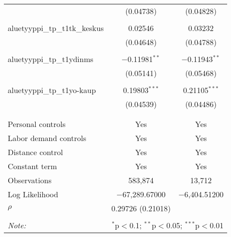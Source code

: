 \begin{table}[!htbp]
\begin{tabular}{@{\extracolsep{5pt}}lcc}
  & (0.04738) & (0.04828) \\ 
  & & \\ 
 aluetyyppi\_tp\_t1tk\_keskus & 0.02546 & 0.03232 \\ 
  & (0.04648) & (0.04788) \\ 
  & & \\ 
 aluetyyppi\_tp\_t1ydinms & $-$0.11981$^{**}$ & $-$0.11943$^{**}$ \\ 
  & (0.05141) & (0.05468) \\ 
  & & \\ 
 aluetyyppi\_tp\_t1yo-kaup & 0.19803$^{***}$ & 0.21105$^{***}$ \\ 
  & (0.04539) & (0.04486) \\ 
  & & \\ 
\hline \\[-1.8ex] 
Personal controls & Yes & Yes \\ 
Labor demand controls & Yes & Yes \\ 
Distance control & Yes & Yes \\ 
Constant term & Yes & Yes \\ 
Observations & 583,874 & 13,712 \\ 
Log Likelihood & $-$67,289.67000 & $-$6,404.51200 \\ 
$\rho$ & 0.29726  (0.21018) &  \\ 
\hline 
\hline \\[-1.8ex] 
\textit{Note:}  & \multicolumn{2}{r}{$^{*}$p$<$0.1; $^{**}$p$<$0.05; $^{***}$p$<$0.01} \\ 
\end{tabular} 
\end{table} 
